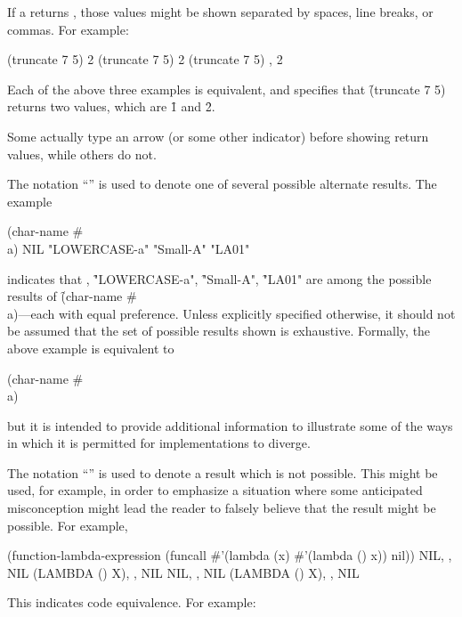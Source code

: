 If a  returns , those values might
be shown separated by spaces, line breaks, or commas.
For example:

\code
 (truncate 7 5)
 2
 (truncate 7 5) 
   2
 (truncate 7 5)
, 2
\endcode

Each of the above three examples is equivalent, and specifies
that \f{(truncate 7 5)} returns two values, which are \f{1} and \f{2}.

Some  actually type an arrow (or some
other indicator) before showing return values, while others do not.

\itemitem{\OV}

The notation ``{\OV}'' is used to denote one of several possible
alternate results.  The example

\code
 (char-name #\\a)
\EV NIL
\OV "LOWERCASE-a"
\OV "Small-A"
\OV "LA01"
\endcode

indicates that \nil, \f{"LOWERCASE-a"}, \f{"Small-A"}, \f{"LA01"} are
among the possible results of \f{(char-name \#\\a)}---each with equal preference.
Unless explicitly specified otherwise, it should not be assumed that the set of possible 
results shown is exhaustive.
Formally, the above example is equivalent to

\code
 (char-name #\\a) \EV {}
\endcode

but it is intended to provide additional information to illustrate some
of the ways in which it is permitted for implementations to diverge.

\itemitem{\NV}

The notation ``{\NV}'' is used to denote a result which is not possible.
This might be used, for example, in order to emphasize a situation where
some anticipated misconception might lead the reader to falsely believe
that the result might be possible.  For example,

\code
 (function-lambda-expression 
    (funcall #'(lambda (x) #'(lambda () x)) nil))
\EV NIL, , NIL
\OV (LAMBDA () X), , NIL
\NV NIL, , NIL
\NV (LAMBDA () X), , NIL
\endcode

\itemitem{\EQ} 

This indicates code equivalence. For example:

